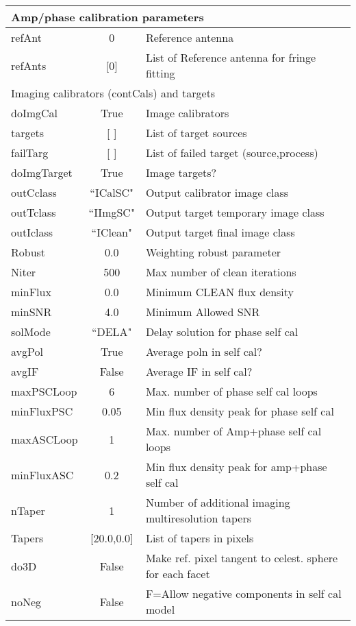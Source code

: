 \documentclass[11pt]{article}
\begin{document}
\begin{center}
\begin{tabular}{|l|c|l|}

\hline
\multicolumn{3}{|l|}{Amp/phase calibration parameters} \\
\hline
refAnt & 0 & Reference antenna \\
refAnts & [0] & List of Reference antenna for fringe fitting \\

\hline
\multicolumn{3}{|l|}{Imaging calibrators (contCals) and targets} \\
\hline
doImgCal & True & Image calibrators \\
targets & [ ] & List of target sources \\
failTarg & [ ] & List of failed target (source,process) \\
doImgTarget & True & Image targets? \\
outCclass & ``ICalSC" & Output calibrator image class \\
outTclass & ``IImgSC" & Output target temporary image class \\
outIclass & ``IClean" & Output target final image class \\
Robust & 0.0 & Weighting robust parameter \\
Niter & 500 & Max number of clean iterations \\
minFlux & 0.0 & Minimum CLEAN flux density \\
minSNR & 4.0 & Minimum Allowed SNR \\
solMode & ``DELA" & Delay solution for phase self cal \\
avgPol & True & Average poln in self cal? \\
avgIF & False & Average IF in self cal? \\
maxPSCLoop & 6 & Max. number of phase self cal loops \\
minFluxPSC & 0.05 & Min flux density peak for phase self cal \\
maxASCLoop & 1 & Max. number of Amp+phase self cal loops \\
minFluxASC & 0.2 & Min flux density peak for amp+phase self cal \\
nTaper & 1 & Number of additional imaging multiresolution tapers \\
Tapers & [20.0,0.0] & List of tapers in pixels \\
do3D & False & Make ref. pixel tangent to celest. sphere for each facet \\
noNeg & False & F=Allow negative components in self cal model \\


\end{tabular}
\end{center}
\end{document}

